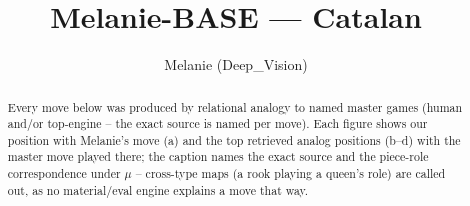\documentclass[11pt]{article}
\title{Melanie-BASE — Catalan}
\author{Melanie (Deep\_Vision)}
\date{}
\begin{document}
\maketitle

\begin{abstract}Every move below was produced by relational analogy to named master games (human and/or top-engine -- the exact source is named per move). Each figure shows our position with Melanie's move (a) and the top retrieved analog positions (b--d) with the master move played there; the caption names the exact source and the piece-role correspondence under $\mu$ -- cross-type maps (a rook playing a queen's role) are called out, as no material/eval engine explains a move that way.\end{abstract}

\begin{figure}[p]\centering
\begin{subfigure}{0.46\textwidth}\centering
\resizebox{\linewidth}{!}{%
\newchessgame
\chessboard[
  setfen={rnbq1rk1/ppp1bppp/4pn2/8/2pP4/5NP1/PP2PPBP/RNBQ1RK1 w - - 0 7},
  showmover=false,
  pgfstyle=straightmove, color=movearrow, markmove={f3-e5}
]}
\caption{}
\end{subfigure}\hfill
\begin{subfigure}{0.46\textwidth}\centering
\resizebox{\linewidth}{!}{%
\newchessgame
\chessboard[
  setfen={rnbq1rk1/ppp1bppp/4pn2/8/2pP4/5NP1/PP2PPBP/RNBQ1RK1 w - - 0 7},
  showmover=false,
  pgfstyle=straightmove, color=movearrow, markmove={f3-e5}
]}
\caption{}
\end{subfigure}
\\[4pt]
\begin{subfigure}{0.46\textwidth}\centering
\resizebox{\linewidth}{!}{%
\newchessgame
\chessboard[
  setfen={rnbq1rk1/ppp1bppp/4pn2/8/2pP4/5NP1/PP2PPBP/RNBQ1RK1 w - - 0 7},
  showmover=false,
  pgfstyle=straightmove, color=movearrow, markmove={f3-e5}
]}
\caption{}
\end{subfigure}\hfill
\begin{subfigure}{0.46\textwidth}\centering
\resizebox{\linewidth}{!}{%
\newchessgame
\chessboard[
  setfen={rnbq1rk1/ppp1bppp/4pn2/8/2pP4/5NP1/PP2PPBP/RNBQ1RK1 w - - 0 7},
  showmover=false,
  pgfstyle=straightmove, color=movearrow, markmove={f3-e5}
]}
\caption{}
\end{subfigure}

\end{figure}
\end{document}
